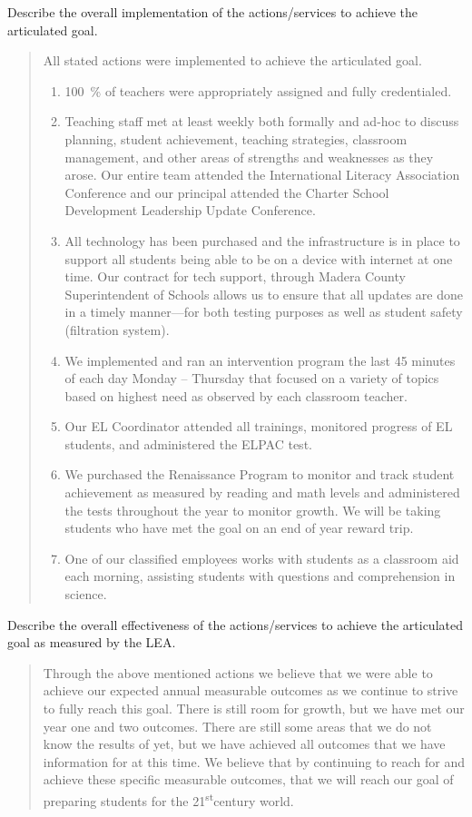 \documentclass{article}
\newcommand{\st}{\textsuperscript{st}}
\newcounter{goal}[section] %
\newcounter{action}[goal]
\newenvironment{actionanalysis}
	{
		\begin{enumerate}[label={\bf Action \theenumi:}]
	}
	{
		\end{enumerate}
	}
\begin{document}
Describe the overall implementation of the actions/services to achieve the articulated goal.
\begin{quotation}
	All stated actions were implemented to achieve the articulated goal.
	\begin{actionanalysis}
	\item \SI{100}{\percent} of teachers were appropriately assigned and fully credentialed.
	\item Teaching staff met at least weekly both formally and ad-hoc to discuss planning, student achievement, teaching strategies, classroom management, and other areas of strengths and weaknesses as they arose. Our entire team attended the International Literacy Association Conference and our principal attended the Charter School Development Leadership Update Conference.
	\item All technology has been purchased and the infrastructure is in place to support all students being able to be on a device with internet at one time. Our contract for tech support, through Madera County Superintendent of Schools allows us to ensure that all updates are done in a timely manner---for both testing purposes as well as student safety (filtration system).
	\item We implemented and ran an intervention program the last 45 minutes of each day Monday -- Thursday that focused on a variety of topics based on highest need as observed by each classroom teacher.
	\item Our EL Coordinator attended all trainings, monitored progress of EL students, and administered the ELPAC test.
	\item We purchased the Renaissance Program to monitor and track student achievement as measured by reading and math levels and administered the tests throughout the year to monitor growth. We will be taking students who have met the goal on an end of year reward trip.
	\item One of our classified employees works with students as a classroom aid each morning, assisting students with questions and comprehension in science.
	\end{actionanalysis}
\end{quotation}

Describe the overall effectiveness of the actions/services to achieve the articulated goal as measured by the LEA.
\begin{quotation}
	Through the above mentioned actions we believe that we were able to achieve our expected annual measurable outcomes as we continue to strive to fully reach this goal. There is still room for growth, but we have met our year one and two outcomes. There are still some areas that we do not know the results of yet, but we have achieved all outcomes that we have information for at this time. We believe that by continuing to reach for and achieve these specific measurable outcomes, that we will reach our goal of preparing students for the 21\st century world.
\end{quotation}
\end{document}
